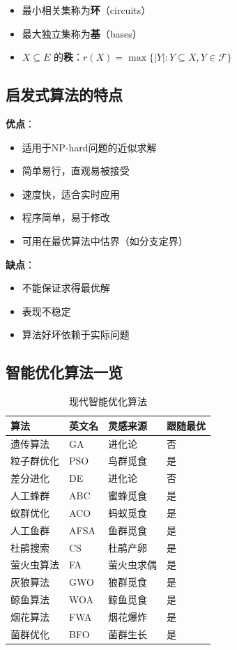 \begin{definition}[基与秩]
\begin{itemize}[itemsep=0.3em]
    \item 最小相关集称为\textbf{环}（circuits）
    \item 最大独立集称为\textbf{基}（bases）
    \item $X \subseteq E$ 的\textbf{秩}：$r(X) = \max\{|Y| : Y \subseteq X, Y \in \mathcal{F}\}$
\end{itemize}
\end{definition}

\subsection{启发式算法的特点}

\textbf{优点}：
\begin{itemize}[itemsep=0.2em]
    \item 适用于NP-hard问题的近似求解
    \item 简单易行，直观易被接受
    \item 速度快，适合实时应用
    \item 程序简单，易于修改
    \item 可用在最优算法中估界（如分支定界）
\end{itemize}

\textbf{缺点}：
\begin{itemize}[itemsep=0.2em]
    \item 不能保证求得最优解
    \item 表现不稳定
    \item 算法好坏依赖于实际问题
\end{itemize}

\subsection{智能优化算法一览}

\begin{table}[htbp]
\centering
\caption{现代智能优化算法}
\begin{tabular}{@{}llll@{}}
\toprule
\textbf{算法} & \textbf{英文名} & \textbf{灵感来源} & \textbf{跟随最优} \\
\midrule
遗传算法 & GA & 进化论 & 否 \\
粒子群优化 & PSO & 鸟群觅食 & 是 \\
差分进化 & DE & 进化论 & 否 \\
人工蜂群 & ABC & 蜜蜂觅食 & 是 \\
蚁群优化 & ACO & 蚂蚁觅食 & 是 \\
人工鱼群 & AFSA & 鱼群觅食 & 是 \\
杜鹃搜索 & CS & 杜鹃产卵 & 是 \\
萤火虫算法 & FA & 萤火虫求偶 & 是 \\
灰狼算法 & GWO & 狼群觅食 & 是 \\
鲸鱼算法 & WOA & 鲸鱼觅食 & 是 \\
烟花算法 & FWA & 烟花爆炸 & 是 \\
菌群优化 & BFO & 菌群生长 & 是 \\
\bottomrule
\end{tabular}
\end{table}

